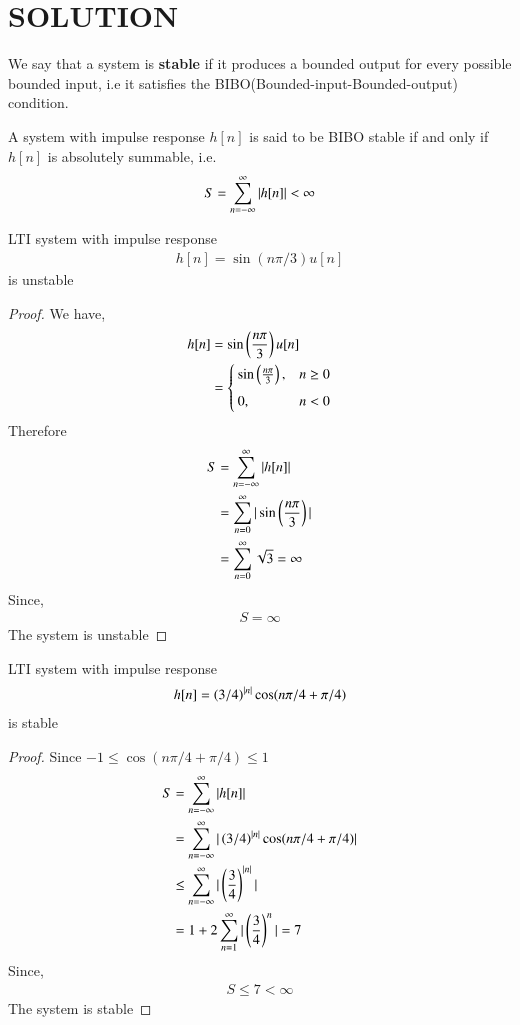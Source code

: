 \documentclass[journal,12pt,twocolumn]{IEEEtran}
\begin{document}
\section{SOLUTION}
%
\begin{definition}
We say that a system is \textbf{stable} if it produces a bounded output for every possible bounded input, i.e it satisfies the BIBO(Bounded-input-Bounded-output) condition.
\end{definition}
%
\begin{lemma}
A system with impulse response $h[n]$ is said to be BIBO stable if and only if $h[n]$ is absolutely summable, i.e.
\begin{align}
    S = \sum_{n=-\infty}^{\infty}\vert h[n]\vert<\infty
\end{align}
\end{lemma}
\begin{lemma}
LTI system with impulse response 
\begin{align}
    h[n] = \sin(n\pi/3)u[n]
\end{align}
is unstable
\end{lemma}
\begin{proof}
We have,
\begin{align}
    h[n] &= \sin\left(\frac{n\pi}{3}\right)u[n]\\
         &= \begin{cases}
         \sin\left(\frac{n\pi}{3}\right), &  n \geq 0 \\~\\[-1em]
	     0, &  n<0 
         \end{cases}
\end{align}
Therefore
\begin{align}
    S &= \sum_{n=-\infty}^{\infty}\vert h[n]\vert\\ 
      &= \sum_{n=0}^{\infty} \vert\sin\left(\frac{n\pi}{3}\right)\vert\\
      &= \sum_{n=0}^{\infty} \sqrt{3}
      = \infty
\end{align}
Since, 
\begin{align}
    S = \infty 
\end{align}
The system is unstable
\end{proof}
\begin{lemma}
LTI system with impulse response 
\begin{align}
    h[n] =\left(3/4\right)^{\vert n\vert}\cos(n\pi/4 +\pi/4)
\end{align}
is stable
\end{lemma}
\begin{proof}
Since $-1\leq \cos(n\pi/4 +\pi/4)\leq 1$
\begin{align}
    S &= \sum_{n=-\infty}^{\infty}\vert h[n]\vert\\
    &= \sum_{n=-\infty}^{\infty}\vert\left(3/4\right)^{\vert n\vert}\cos(n\pi/4 +\pi/4)\vert\\
    &\leq \sum_{n=-\infty}^{\infty}\vert\left(\frac{3}{4}\right)^{\vert n\vert}\vert\\
    &=1+ 2\sum_{n=1}^{\infty}\vert\left(\frac{3}{4}\right)^{n}\vert
    = 7
\end{align}
Since,
\begin{align}
    S \leq 7 < \infty
\end{align}
The system is stable 
\end{proof}
\end{document}
